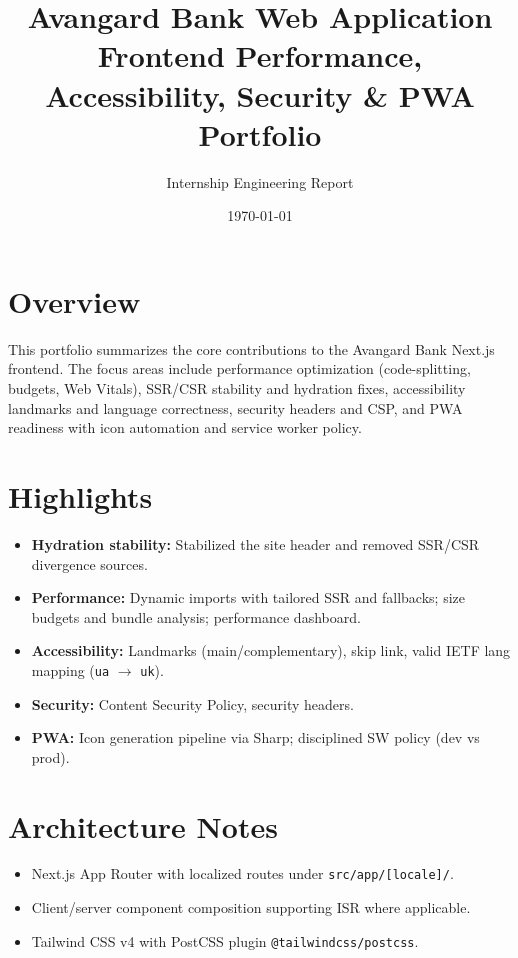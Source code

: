 \documentclass[11pt,a4paper]{article}
\title{Avangard Bank Web Application\\Frontend Performance, Accessibility, Security \& PWA Portfolio}
\author{Internship Engineering Report}
\date{\today}
\begin{document}
\maketitle
\tableofcontents
\newpage

\section{Overview}
This portfolio summarizes the core contributions to the Avangard Bank Next.js frontend. The focus areas include performance optimization (code-splitting, budgets, Web Vitals), SSR/CSR stability and hydration fixes, accessibility landmarks and language correctness, security headers and CSP, and PWA readiness with icon automation and service worker policy.

\section{Highlights}
\begin{itemize}[leftmargin=1.2em]
  \item \textbf{Hydration stability:} Stabilized the site header and removed SSR/CSR divergence sources.
  \item \textbf{Performance:} Dynamic imports with tailored SSR and fallbacks; size budgets and bundle analysis; performance dashboard.
  \item \textbf{Accessibility:} Landmarks (main/complementary), skip link, valid IETF lang mapping (\texttt{ua} \(\to\) \texttt{uk}).
  \item \textbf{Security:} Content Security Policy, security headers.
  \item \textbf{PWA:} Icon generation pipeline via Sharp; disciplined SW policy (dev vs prod).
\end{itemize}

\section{Architecture Notes}
\begin{itemize}[leftmargin=1.2em]
  \item Next.js App Router with localized routes under \texttt{src/app/[locale]/}.
  \item Client/server component composition supporting ISR where applicable.
  \item Tailwind CSS v4 with PostCSS plugin \texttt{@tailwindcss/postcss}.
\end{itemize}
\end{document}

